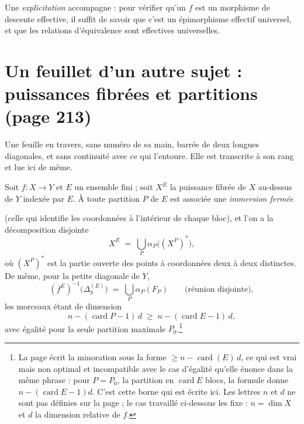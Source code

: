 \documentclass[11pt,a4paper]{article}
\begin{document}
Une \emph{explicitation} accompagne : pour vérifier qu'un $f$ est un morphisme
de descente effective, il suffit de savoir que c'est un épimorphisme effectif
universel, et que les relations d'équivalence sont effectives universelles.


\section*{Un feuillet d'un autre sujet : puissances fibrées et partitions (page 213)}

Une feuille en travers, sans numéro de sa main, barrée de deux longues
diagonales, et sans continuité avec ce qui l'entoure. Elle est transcrite à son
rang et lue ici de même.

Soit $f : X \to Y$ et $E$ un ensemble fini ; soit $X^{E}$ la puissance fibrée
de $X$ au-dessus de $Y$ indexée par $E$. À toute partition $P$ de $E$ est
associée une \emph{immersion fermée}


(celle qui identifie les coordonnées à l'intérieur de chaque bloc), et
l'on a la décomposition disjointe
\[
  X^{E} \;=\; \bigcup_{P} \alpha_{P}\bigl((X^{P})^{\ast}\bigr) ,
\]
où $(X^{P})^{\ast}$ est la partie ouverte des points à coordonnées deux à deux
distinctes. De même, pour la petite diagonale de $Y$,
\[
  (f^{E})^{-1}\bigl(\Delta_{y}^{(E)}\bigr) \;=\;
  \bigcup_{P} \alpha_{P}(F_{P}) \qquad \text{(réunion disjointe)} ,
\]
les morceaux étant de dimension
\[
  n - (\operatorname{card} P - 1)\, d \;\geqslant\;
  n - (\operatorname{card} E - 1)\, d ,
\]
avec égalité pour la seule partition maximale
$P_{0}$.\footnote{La page écrit la minoration sous la forme
$\geqslant n - \operatorname{card}(E)\,d$, ce qui est vrai mais non optimal et
incompatible avec le cas d'égalité qu'elle énonce dans la même phrase : pour
$P = P_{0}$, la partition en $\operatorname{card} E$ blocs, la formule donne
$n - (\operatorname{card} E - 1)d$. C'est cette borne qui est écrite ici. Les
lettres $n$ et $d$ ne sont pas définies sur la page ; le cas travaillé
ci-dessous les fixe : $n = \dim X$ et $d$ la dimension relative de $f$.}
\end{document}
